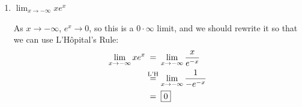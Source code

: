 \documentclass[main]{subfiles}
\begin{document}
\begin{enumerate}
\begin{enumerate}
      \begin{solution} 
        As $x \to 0^+$, $\cos x \to 1$ and $\frac{1}{x^2} \to \infty$, so
        this is a $1^\infty$ limit.  Therefore, we should rewrite it so
        that we can apply L'Hôpital's Rule:
        \begin{align} 
          (\cos x)^{1/x^2} &= e^{\raisebox{3pt}{$\ln \left[ (\cos
                x)^{1/x^2} \right]$}} \nonumber \\
          &= e^{\raisebox{4pt}{$\frac{1}{x^2} \ln (\cos
              x)$}} \label{eq:limit-1-to-the-inf-1}
        \end{align}
        Now, let's focus on what happens to the exponent
        in the last expression as $x \to 0^+$:
        \begin{align*}
          \lim_{x \to 0^+} \frac{1}{x^2} \ln
          (\cos x) & \nolheq \lim_{x \to 0^+} \frac{\ln (\cos x)}{x^2} \\
          \shortintertext{This is a $\frac{0}{0}$ limit:}
          & \lheq \lim_{x \to 0^+} \frac{\frac{1}{\cos x} \cdot (-\sin
            x)}{2x} \\
          \intertext{This is still a $\frac{0}{0}$ limit; let's
            rewrite it before we apply L'Hôpital's Rule again:}
          & \nolheq \lim_{x \to 0^+} \frac{- \tan x}{2x} \\
          & \lheq \lim_{x \to 0^+} \frac{- \sec^2 x}{2} \\
          &= - \frac{1}{2}
        \end{align*}
        Remember that this was only the limit of the exponent in
        \eqref{eq:limit-1-to-the-inf-1}, so the limit we want is
        $\boxed{e^{-1/2}}$.
      \end{solution}


  \item
    \begin{problem}[\vfill]
      $\displaystyle \lim_{x \to -\infty} x e^x$
    \end{problem}

    \begin{solution}
    As $x \to -\infty$, $e^x \to 0$, so this is a $0 \cdot \infty$
    limit, and we should rewrite it so that we can use L'Hôpital's
    Rule:
    \begin{align*}
      \lim_{x \to -\infty} x e^x & \nolheq \lim_{x \to -\infty}
      \frac{x}{e^{-x}} \\
      & \lheq \lim_{x \to -\infty} \frac{1}{-e^{-x}} \\
      & \nolheq \boxed{0}
    \end{align*}
  \end{solution}


\end{enumerate}
\end{enumerate}
\end{document}

